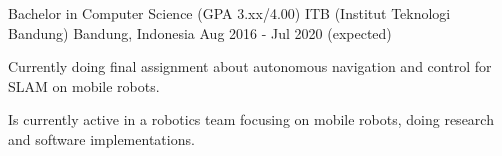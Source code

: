 

\begin{cventries}

  \cventry
    {Bachelor in Computer Science (GPA 3.xx/4.00)} %
    {ITB (Institut Teknologi Bandung)} %
    {Bandung, Indonesia} %
    {Aug 2016 - Jul 2020 (expected)} %
    {
   	  \begin{cvitems}
		  \item {Currently doing final assignment about autonomous navigation and control for SLAM on mobile robots.}
          \item {Is currently active in a robotics team focusing on mobile robots, doing research and software implementations.}
   	  \end{cvitems}
    }

\end{cventries}
